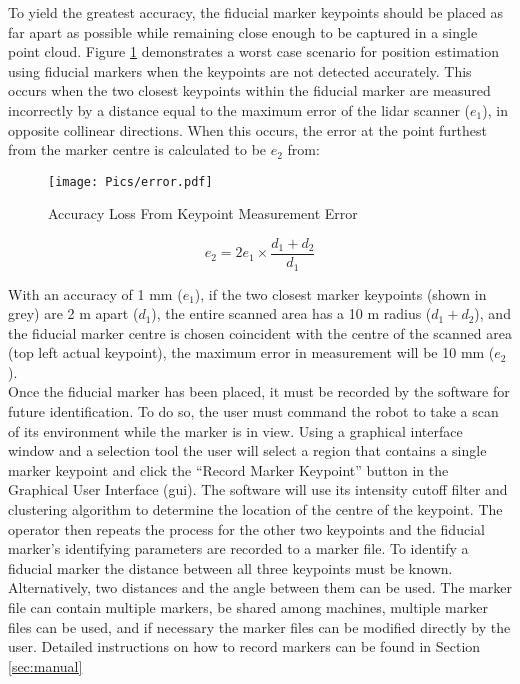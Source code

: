 To yield the greatest accuracy, the fiducial marker keypoints should be placed as far apart as possible while remaining close enough to be captured in a single point cloud. Figure \ref{fig:resacc} demonstrates a worst case scenario for position estimation using fiducial markers when the keypoints are not detected accurately. This occurs when the two closest keypoints within the fiducial marker are measured incorrectly by a distance equal to the maximum error of the \acrshort{lidar} scanner ($e_1$), in opposite collinear directions. When this occurs, the error at the point furthest from the marker centre is calculated to be $e_2$ from:

\begin{figure}
\centering
\texttt{[image: Pics/error.pdf]}
\caption{Accuracy Loss From Keypoint Measurement Error}
\label{fig:resacc} 
\end{figure}

\begin{equation}
   e_2 = 2e_1\times\frac{d_1+d_2}{d_1}\label{eq:2}
\end{equation}

With an accuracy of 1 mm ($e_1$), if the two closest marker keypoints (shown in grey) are 2 m apart ($d_1$), the entire scanned area has a 10 m radius ($d_1+d_2$), and the fiducial marker centre is chosen coincident with the centre of the scanned area (top left actual keypoint), the maximum error in measurement will be 10 mm ($e_2$).\\

Once the fiducial marker has been placed, it must be recorded by the software for future identification. To do so, the user must command the robot to take a scan of its environment while the marker is in view. Using a graphical interface window and a selection tool the user will select a region that contains a single marker keypoint and click the ``Record Marker Keypoint'' button in the Graphical User Interface (\acrshort{gui}). The software will use its intensity cutoff filter and clustering algorithm to determine the location of the centre of the keypoint. The operator then repeats the process for the other two keypoints and the fiducial marker's identifying parameters are recorded to a marker file. To identify a fiducial marker the distance between all three keypoints must be known. Alternatively, two distances and the angle between them can be used. The marker file can contain multiple markers, be shared among machines, multiple marker files can be used, and if necessary the marker files can be modified directly by the user. Detailed instructions on how to record markers can be found in Section \ref{sec:manual}\\

